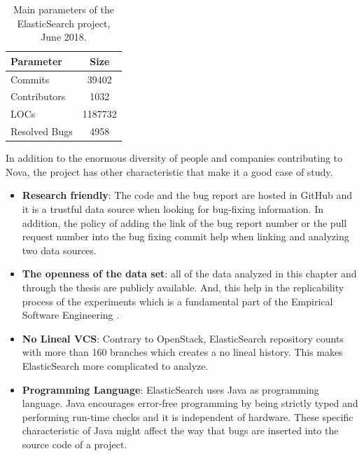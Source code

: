 \documentclass[a4paper, 12pt]{book}
\begin{document}
 \begin{table}[!t]
\renewcommand{\arraystretch}{0.8}
\caption{Main parameters of the ElasticSearch project, June 2018.}
\label{tableES}
\centering

\begin{tabular}{|l|c|}
\hline
Parameter & Size \\
\hline
\hline
Commits & 39402 \\
\hline
Contributors & 1032 \\
\hline
LOCs & 1187732\\
\hline
Resolved Bugs & 4958\\
\hline
\end{tabular}
\end{table}

In addition to the enormous diversity of people and companies contributing to Nova, the project has other characteristic that make it a good case of study.
\begin{itemize}
	\item \textbf{Research friendly}: The code and the bug report are hosted in GitHub and it is a trustful data source when looking for bug-fixing information. In addition, the policy of adding the link of the bug report number or the pull request number into the bug fixing commit help when linking and analyzing two data sources.
	\item \textbf{The openness of the data set}: all of the data analyzed in this chapter and through the thesis are publicly available. And, this help in the replicability process of the experiments which is a fundamental part of the Empirical Software Engineering .
	\item \textbf{No Lineal VCS}: Contrary to OpenStack, ElasticSearch repository counts with more than 160 branches which creates a no lineal history. This makes ElasticSearch more complicated to analyze.
	\item \textbf{Programming Language}: ElasticSearch uses Java as programming language. Java encourages error-free programming by being strictly typed and performing run-time checks and it is independent of hardware. These specific characteristic of Java might affect the way that bugs are inserted into the source code of a project.
	\end{itemize}
\end{document}
